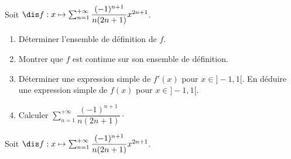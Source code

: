 \documentclass[a4paper,10pt]{report}
\begin{document}
  
  \begin{Exa} Soit $\dis f : x \mapsto \sum_{n=1}^{+ \infty} \dfrac{(-1)^{n+1}}{n(2n+1)} x^{2n+1}$.

\begin{enumerate}
\item Déterminer l'ensemble de définition de $f$.
\item Montrer que $f$ est continue sur son ensemble de définition.
\item Déterminer une expression simple de $f'(x)$ pour $x \in ]-1,1[$. En déduire une expression simple de $f(x)$ pour $x \in ]-1,1[$.
\item Calculer $ \sum_{n=1}^{+ \infty} \dfrac{(-1)^{n+1}}{n(2n+1)} \cdot$
\end{enumerate}
\end{Exa}


\corr  Soit $\dis f : x \mapsto \sum_{n=1}^{+ \infty} \dfrac{(-1)^{n+1}}{n(2n+1)} x^{2n+1}$.
\end{document}
